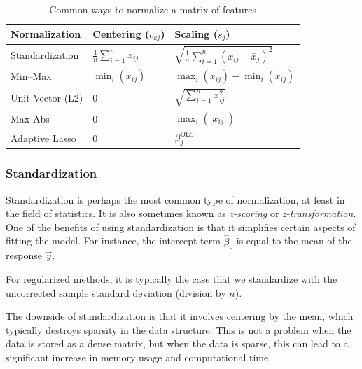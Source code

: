 \begin{table}[hbt]
  \centering
  \caption{Common ways to normalize a matrix of features}
  \label{tab:normalization-types}
  \begin{tabular}{lll}
    \toprule
    Normalization    & Centering (\(c_{kj}\))             & Scaling (\(s_j\))                                         \\
    \midrule
    Standardization  & \(\frac{1}{n}\sum_{i=1}^n x_{ij}\) & \(\sqrt{\frac{1}{n}\sum_{i=1}^n (x_{ij} - \bar{x}_j)^2}\) \\
    \addlinespace
    Min--Max         & \(\min_i(x_{ij})\)                 & \(\max_i(x_{ij}) - \min_i(x_{ij})\)                       \\
    \addlinespace
    Unit Vector (L2) & 0                                  & \(\sqrt{\sum_{i=1}^n x_{ij}^2}\)                          \\
    \addlinespace
    Max Abs          & 0                                  & \(\max_i(|x_{ij}|)\)                                      \\
    \addlinespace
    Adaptive Lasso   & 0                                  & \(\beta_j^\text{OLS}\)                                    \\
    \bottomrule
  \end{tabular}
\end{table}

\subsubsection{Standardization}

Standardization is perhaps the most common type of normalization, at least in the field of statistics. It is also sometimes known as \emph{z-scoring} or \emph{z-transformation}. One of the benefits of using standardization is that it simplifies certain aspects of fitting the model. For instance, the intercept term \(\hat\beta_0\) is equal to the mean of the response \(\vec y\).

For regularized methods, it is typically the case that we standardize with the uncorrected sample standard deviation (division by \(n\)).

The downside of standardization is that it involves centering by the mean, which typically destroys sparsity in the data structure. This is not a problem when the data is stored as a dense matrix, but when the data is sparse, this can lead to a significant increase in memory usage and computational time.

